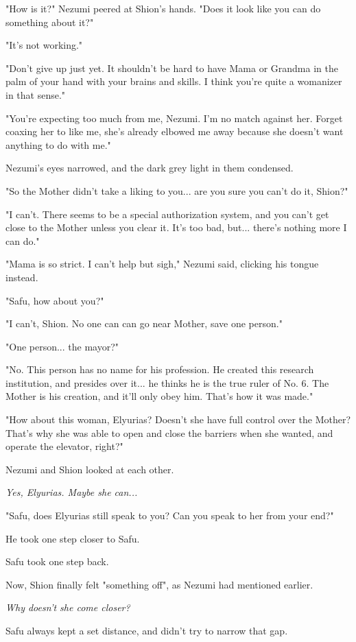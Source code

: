 "How is it?" Nezumi peered at Shion's hands. "Does it look like you can
do something about it?"

"It's not working."

"Don't give up just yet. It shouldn't be hard to have Mama or Grandma in
the palm of your hand with your brains and skills. I think you're quite
a womanizer in that sense."

"You're expecting too much from me, Nezumi. I'm no match against her.
Forget coaxing her to like me, she's already elbowed me away because she
doesn't want anything to do with me."

Nezumi's eyes narrowed, and the dark grey light in them condensed.

"So the Mother didn't take a liking to you... are you sure you can't do
it, Shion?"

"I can't. There seems to be a special authorization system, and you
can't get close to the Mother unless you clear it. It's too bad, but...
there's nothing more I can do."

"Mama is so strict. I can't help but sigh," Nezumi said, clicking his
tongue instead.

"Safu, how about you?"

"I can't, Shion. No one can can go near Mother, save one person."

"One person... the mayor?"

"No. This person has no name for his profession. He created this
research institution, and presides over it... he thinks he is the true
ruler of No. 6. The Mother is his creation, and it'll only obey him.
That's how it was made."

"How about this woman, Elyurias? Doesn't she have full control over the
Mother? That's why she was able to open and close the barriers when she
wanted, and operate the elevator, right?"

Nezumi and Shion looked at each other.

\emph{Yes, Elyurias. Maybe she can...}

"Safu, does Elyurias still speak to you? Can you speak to her from your
end?"

He took one step closer to Safu.

Safu took one step back.

Now, Shion finally felt "something off", as Nezumi had mentioned
earlier.

\emph{Why doesn't she come closer?}

Safu always kept a set distance, and didn't try to narrow that gap.

